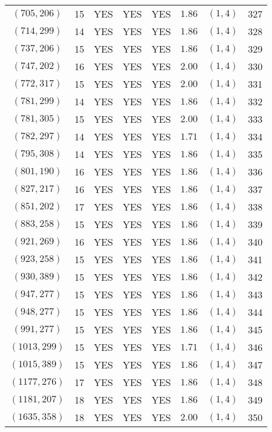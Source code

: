 \begin{longtable}{|c|c|c|c|c|c|c|c|}
$(705,206)$ & 15 & YES & YES & YES & $1.86$ & $(1,4)$ & 327\\
$(714,299)$ & 14 & YES & YES & YES & $1.86$ & $(1,4)$ & 328\\
$(737,206)$ & 15 & YES & YES & YES & $1.86$ & $(1,4)$ & 329\\
$(747,202)$ & 16 & YES & YES & YES & $2.00$ & $(1,4)$ & 330\\
$(772,317)$ & 15 & YES & YES & YES & $2.00$ & $(1,4)$ & 331\\
$(781,299)$ & 14 & YES & YES & YES & $1.86$ & $(1,4)$ & 332\\
$(781,305)$ & 15 & YES & YES & YES & $2.00$ & $(1,4)$ & 333\\
$(782,297)$ & 14 & YES & YES & YES & $1.71$ & $(1,4)$ & 334\\
$(795,308)$ & 14 & YES & YES & YES & $1.86$ & $(1,4)$ & 335\\
$(801,190)$ & 16 & YES & YES & YES & $1.86$ & $(1,4)$ & 336\\
$(827,217)$ & 16 & YES & YES & YES & $1.86$ & $(1,4)$ & 337\\
$(851,202)$ & 17 & YES & YES & YES & $1.86$ & $(1,4)$ & 338\\
$(883,258)$ & 15 & YES & YES & YES & $1.86$ & $(1,4)$ & 339\\
$(921,269)$ & 16 & YES & YES & YES & $1.86$ & $(1,4)$ & 340\\
$(923,258)$ & 15 & YES & YES & YES & $1.86$ & $(1,4)$ & 341\\
$(930,389)$ & 15 & YES & YES & YES & $1.86$ & $(1,4)$ & 342\\
$(947,277)$ & 15 & YES & YES & YES & $1.86$ & $(1,4)$ & 343\\
$(948,277)$ & 15 & YES & YES & YES & $1.86$ & $(1,4)$ & 344\\
$(991,277)$ & 15 & YES & YES & YES & $1.86$ & $(1,4)$ & 345\\
$(1013,299)$ & 15 & YES & YES & YES & $1.71$ & $(1,4)$ & 346\\
$(1015,389)$ & 15 & YES & YES & YES & $1.86$ & $(1,4)$ & 347\\
$(1177,276)$ & 17 & YES & YES & YES & $1.86$ & $(1,4)$ & 348\\
$(1181,207)$ & 18 & YES & YES & YES & $1.86$ & $(1,4)$ & 349\\
$(1635,358)$ & 18 & YES & YES & YES & $2.00$ & $(1,4)$ & 350
\end{longtable}
